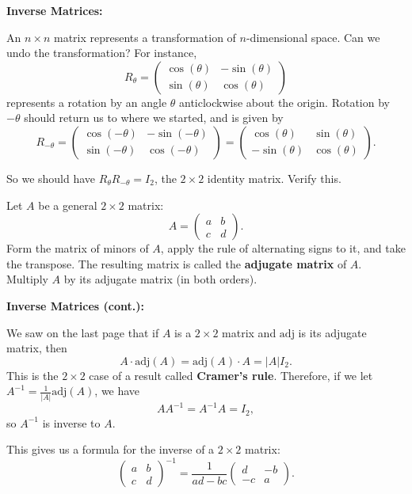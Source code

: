 \documentclass{article}
\begin{document}
\clearpage


\textbf{Inverse Matrices:}\bigskip

An $n\times n$ matrix represents a transformation of $n$-dimensional space. Can we undo the transformation? For instance,
\[R_\theta=\left(\begin{array}{cc} \cos(\theta)&-\sin(\theta)\\\sin(\theta)&\cos(\theta)\end{array}\right)\]
represents a rotation by an angle $\theta$ anticlockwise about the origin. Rotation by $-\theta$ should return us to where we started, and is given by
\[R_{-\theta}=\left(\begin{array}{cc} \cos(-\theta)&-\sin(-\theta)\\\sin(-\theta)&\cos(-\theta)\end{array}\right)=\left(\begin{array}{cc} \cos(\theta)&\sin(\theta)\\-\sin(\theta)&\cos(\theta)\end{array}\right).\]

So we should have $R_\theta R_{-\theta}=I_2$, the $2\times 2$ identity matrix. Verify this.

\vfill


Let $A$ be a general $2\times 2$ matrix:
\[A=\left(\begin{array}{cc}a&b\\c&d\end{array}\right).\]
Form the matrix of minors of $A$, apply the rule of alternating signs to it, and take the transpose. The resulting matrix is called the \textbf{adjugate matrix} of $A$. Multiply $A$ by its adjugate matrix (in both orders).

\vfill

\clearpage



\textbf{Inverse Matrices (cont.):}\bigskip

We saw on the last page that if $A$ is a $2\times 2$ matrix and $\mathrm{adj}$ is its adjugate matrix, then
\[A\cdot \mathrm{adj}(A)=\mathrm{adj}(A)\cdot A=|A|I_2.\]
This is the $2\times 2$ case of a result called \textbf{Cramer's rule}. Therefore, if we let $A^{-1}=\frac{1}{|A|}\mathrm{adj}(A)$, we have
\[AA^{-1}=A^{-1}A=I_2,\]
so $A^{-1}$ is inverse to $A$.

This gives us a formula for the inverse of a $2\times 2$ matrix:
\[\left(\begin{array}{cc}a&b\\c&d\end{array}\right)^{-1}=\frac{1}{ad-bc}\left(\begin{array}{cc}d&-b\\-c&a\end{array}\right).\]\bigskip
\end{document}
